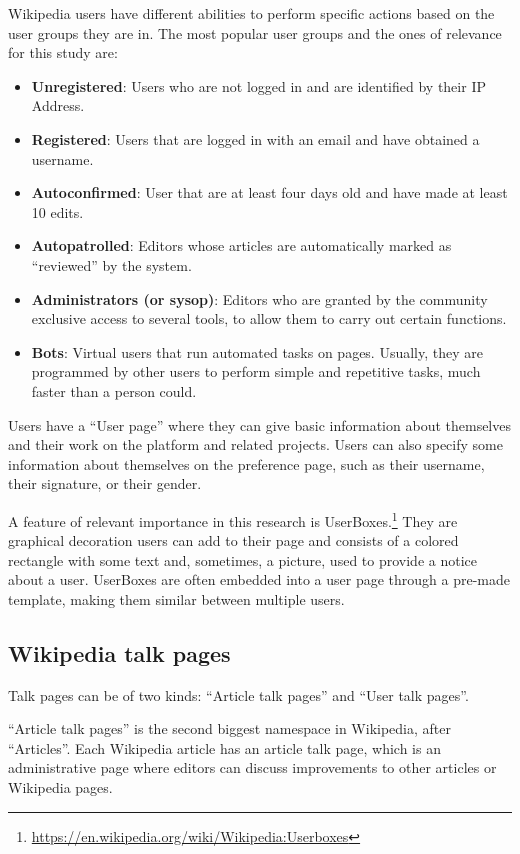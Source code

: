 Wikipedia users have different abilities to perform specific actions based on the user groups they are in. The most popular user groups and the ones of relevance for this study are:
\begin{itemize}
\item \textbf{Unregistered}: Users who are not logged in and are identified by their IP Address.
\item \textbf{Registered}: Users that are logged in with an email and have obtained a username.
\item \textbf{Autoconfirmed}: User that are at least four days old and have made at least 10 edits.
\item \textbf{Autopatrolled}: Editors whose articles are automatically marked as “reviewed” by the system.
\item \textbf{Administrators (or sysop)}: Editors who are granted by the community exclusive access to several tools, to allow them to carry out certain functions.
\item \textbf{Bots}: Virtual users that run automated tasks on pages. Usually, they are programmed by other users to perform simple and repetitive tasks, much faster than a person could.
\end{itemize}

Users have a “User page” where they can give basic information about themselves and their work on the platform and related projects. Users can also specify some information about themselves on the preference page, such as their username, their signature, or their gender.


A feature of relevant importance in this research is UserBoxes.\footnote{\url{https://en.wikipedia.org/wiki/Wikipedia:Userboxes}} They are graphical decoration users can add to their page and consists of a colored rectangle with some text and, sometimes, a picture, used to provide a notice about a user. UserBoxes are often embedded into a user page through a pre-made template, making them similar between multiple users. 


\subsection{Wikipedia talk pages}
\label{sec:wikipediatalkpages}
Talk pages can be of two kinds: “Article talk pages” and “User talk pages”.

“Article talk pages” is the second biggest namespace in Wikipedia, after “Articles”. Each Wikipedia article has an article talk page, which is an administrative page where editors can discuss improvements to other articles or Wikipedia pages.


